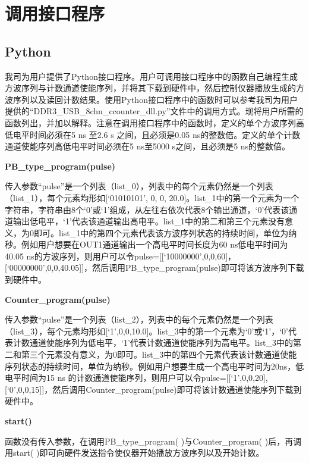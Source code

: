 \chapter{\heiti 调用接口程序}
\section{Python }
我司为用户提供了Python接口程序。用户可调用接口程序中的函数自己编程生成方波序列与计数通道使能序列，并将其下载到硬件中，然后控制仪器播放生成的方波序列以及读回计数结果。使用Python接口程序中的函数时可以参考我司为用户提供的“DDR3\_USB\_8chn\_ccounter\_dll.py”文件中的调用方式。现将用户所需的函数列出，并加以解释。注意在调用接口程序中的函数时，定义的单个方波序列高低电平时间必须在5 ns 至2.6 s 之间，且必须是0.05 ns的整数倍。定义的单个计数通道使能序列高低电平时间必须在5 ns至5000 s之间，且必须是5 ns的整数倍。
\vspace{0.4cm}

\noindent\fontsize{12pt}{\baselineskip}\textbf{PB\_type\_program(pulse)}

传入参数“pulse”是一个列表（list\_0），列表中的每个元素仍然是一个列表（list\_1），每个元素均形如[`01010101', 0, 0, 20.0]。list\_1中的第一个元素为一个字符串，字符串由8个‘0’或‘1’组成，从左往右依次代表8个输出通道，‘0’代表该通道输出低电平，‘1’代表该通道输出高电平。list\_1中的第二和第三个元素没有意义，为0即可。list\_1中的第四个元素代表该方波序列状态的持续时间，单位为纳秒。例如用户想要在OUT1通道输出一个高电平时间长度为60 ns低电平时间为40.05 ns的方波序列，则用户可以令pulse=[[`10000000',0,0,60]， [`00000000',0,0,40.05]]，然后调用PB\_type\_program(pulse)即可将该方波序列下载到硬件中。
\vspace{0.4cm}

\noindent\fontsize{12pt}{\baselineskip}\textbf{Counter\_program(pulse)}

传入参数“pulse”是一个列表（list\_2），列表中的每个元素仍然是一个列表（list\_3），每个元素均形如[`1',0,0,10.0]。list\_3中的第一个元素为‘0’或‘1’，‘0’代表计数通道使能序列为低电平，‘1’代表计数通道使能序列为高电平。list\_3中的第二和第三个元素没有意义，为0即可。list\_3中的第四个元素代表该计数通道使能序列状态的持续时间，单位为纳秒。例如用户想要生成一个高电平时间为20ns，低电平时间为15 ns 的计数通道使能序列，则用户可以令pulse=[[`1',0,0,20], [`0',0,0,15]]，然后调用Counter\_program(pulse)即可将该计数通道使能序列下载到硬件中。

\newpage
\noindent\fontsize{12pt}{\baselineskip}\textbf{start()}

函数没有传入参数，在调用PB\_type\_program( )与Counter\_program( )后，再调用start( )即可向硬件发送指令使仪器开始播放方波序列以及开始计数。
\vspace{0.4cm}

